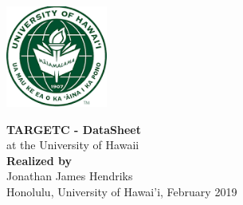 
\begin{titlepage}

  \begin{flushright}

   \includegraphics[width=0.25\textwidth]{figures/uhm.png}\\

   \vspace*{6cm}


	\textbf{\Huge{TARGETC -  DataSheet}}\\
	\LARGE{at the University of Hawaii}\\
  \vspace*{2cm}
  \textbf{\normalsize{Realized by}}\\
  \normalsize{Jonathan James Hendriks}\\
  \vspace*{4cm}
  \normalsize{Honolulu, University of Hawai'i, February 2019}\\



    \end{flushright}


\end{titlepage}


